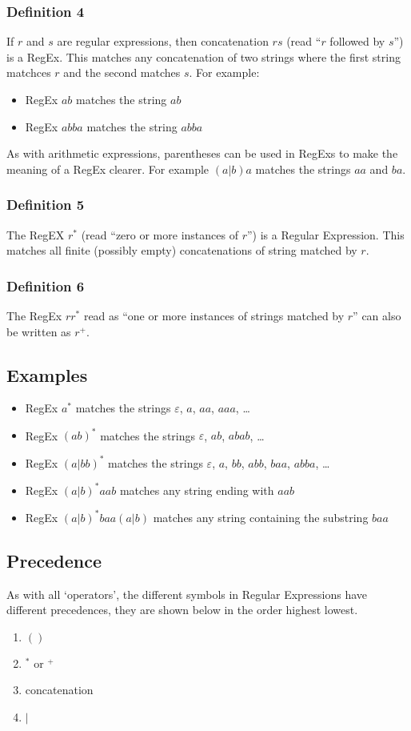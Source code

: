 \subsubsection{Definition 4}
If $r$ and $s$ are regular expressions, then concatenation $rs$ (read ``$r$ followed by $s$'') is a RegEx. This matches any concatenation of two strings where the first string matchces $r$ and the second matches $s$. For example: 
\begin{itemize}
    \item RegEx $ab$ matches the string $ab$
    \item RegEx $abba$ matches the string $abba$
\end{itemize}
As with arithmetic expressions, parentheses can be used in RegExs to make the meaning of a RegEx clearer. For example $(a|b)a$ matches the strings $aa$ and $ba$. 

\subsubsection{Definition 5}
The RegEX $r^*$ (read ``zero or more instances of $r$'') is a Regular Expression. This matches all finite (possibly empty) concatenations of string matched by $r$.

\subsubsection{Definition 6}
The RegEx $rr^*$ read as ``one or more instances of strings matched by $r$'' can also be written as $r^+$. 

\subsection{Examples}
\begin{itemize}
    \item RegEx $a^*$ matches the strings $\varepsilon$, $a$, $aa$, $aaa$, \ldots
    \item RegEx $(ab)^*$ matches the strings $\varepsilon$, $ab$, $abab$, \ldots
    \item RegEx $(a|bb)^*$ matches the strings $\varepsilon$, $a$, $bb$, $abb$, $baa$, $abba$, \ldots
    \item RegEx $(a|b)^*aab$ matches any string ending with $aab$
    \item RegEx $(a|b)^*baa(a|b)$ matches any string containing the substring $baa$
\end{itemize}

\subsection{Precedence}
As with all `operators', the different symbols in Regular Expressions have different precedences, they are shown below in the order highest \rightarrow lowest.
\begin{enumerate}
    \item $()$
    \item $^*$ or $^+$
    \item concatenation
    \item $|$
\end{enumerate}

